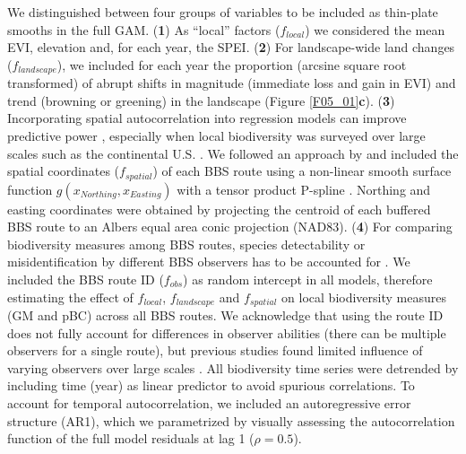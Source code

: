 We distinguished between four groups of variables to be included as thin-plate smooths in the full GAM. (\textbf{1}) As “local” factors ($f_{local}$) we considered the mean EVI, elevation and, for each year, the SPEI. (\textbf{2}) For landscape-wide land changes ($f_{landscape}$), we included for each year the proportion (arcsine square root transformed) of abrupt shifts in magnitude (immediate loss and gain in EVI) and trend (browning or greening) in the landscape (Figure \ref{F05_01}\textbf{c}). (\textbf{3}) Incorporating spatial autocorrelation into regression models can improve predictive power \citep{Kneib2009,Dornelas2013}, especially when local biodiversity was surveyed over large scales such as the continental U.S. . We followed an approach by \citeauthor{Kneib2009} and included the spatial coordinates ($f_{spatial}$) of each BBS route using a non-linear smooth surface function $g(x_{Northing},x_{Easting})$ with a tensor product P-spline \citep{Kneib2009}. Northing and easting coordinates were obtained by projecting the centroid of each buffered BBS route to an Albers equal area conic projection (NAD83). (\textbf{4}) For comparing biodiversity measures among BBS routes, species detectability or misidentification by different BBS observers has to be accounted for \citep{Sauer1994,Harris2018}. We included the BBS route ID ($f_{obs}$) as random intercept in all models, therefore estimating the effect of $f_{local}$, $f_{landscape}$ and $f_{spatial}$ on local biodiversity measures (GM and pBC) across all BBS routes. We acknowledge that using the route ID does not fully account for differences in observer abilities (there can be multiple observers for a single route), but previous studies found limited influence of varying observers over large scales \citep{Jarzyna2017,Barnagaud2017}. All biodiversity time series were detrended by including time (year) as linear predictor to avoid spurious correlations. To account for temporal autocorrelation, we included an autoregressive error structure (AR1), which we parametrized by visually assessing the autocorrelation function of the full model residuals at lag 1 ($\rho = 0.5$).

